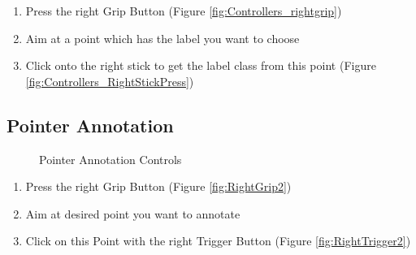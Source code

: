 \documentclass[notitlepage]{article}
\begin{document}
\qquad
\begin{enumerate}
\item Press the right Grip Button (Figure \ref{fig:Controllers_rightgrip}) \\
\item Aim at a point which has the label you want to choose\\
\item Click onto the right stick to get the label class from this point (Figure \ref{fig:Controllers_RightStickPress})
\end{enumerate} 

\bigskip
\bigskip
\bigskip
\subsection{Pointer Annotation}

\begin{figure}[H]
   \centering
    \quad
    \caption{Pointer Annotation Controls}\label{fig:UI-Interaction}%
\end{figure}

\qquad
\begin{enumerate}
\item Press the right Grip Button (Figure \ref{fig:RightGrip2}) \\
\item Aim at desired point you want to annotate\\
\item Click on this Point with the right Trigger Button (Figure \ref{fig:RightTrigger2})
\end{enumerate} 
\end{document}
